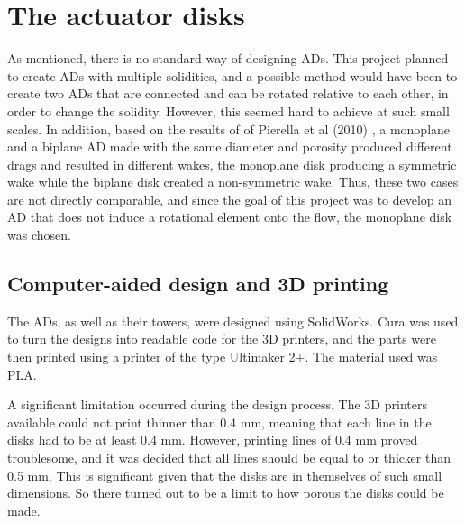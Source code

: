 \section{The actuator disks}
As mentioned, there is no standard way of designing \gls{AD}s. This project planned to create \gls{AD}s with multiple solidities, and a possible method would have been to create two \gls{AD}s that are connected and can be rotated relative to each other, in order to change the solidity. However, this seemed hard to achieve at such small scales. In addition, based on the results of of Pierella et al (2010) \cite{Pierella2010}, a monoplane and a biplane \gls{AD} made with the same diameter and porosity produced different drags and resulted in different wakes, the monoplane disk producing a symmetric wake while the biplane disk created a non-symmetric wake. Thus, these two cases are not directly comparable, and since the goal of this project was to develop an \gls{AD} that does not induce a rotational element onto the flow, the monoplane disk was chosen. 

 

\subsection{Computer-aided design and 3D printing}
The \gls{AD}s, as well as their towers, were designed using SolidWorks. Cura was used to turn the designs into readable code for the 3D printers, and the parts were then printed using a printer of the type Ultimaker 2+. The material used was PLA.

A significant limitation occurred during the design process. The 3D printers available could not print thinner than 0.4 \si{\mm}, meaning that each line in the disks had to be at least 0.4 \si{\mm}. However, printing lines of 0.4 \si{\mm} proved troublesome, and it was decided that all lines should be equal to or thicker than 0.5 \si{\mm}. This is significant given that the disks are in themselves of such small dimensions. So there turned out to be a limit to how porous the disks could be made. 


